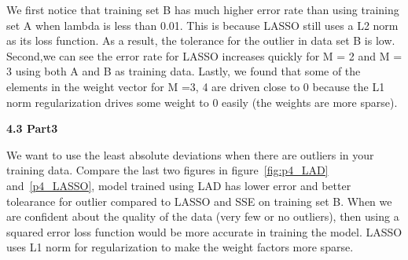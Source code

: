 We first notice that training set B has much higher error rate than using training set A when lambda is less than 0.01. This is because LASSO still uses a L2 norm as its loss function. As a result, the tolerance for the outlier in data set B is low. Second,we can see the error rate for LASSO increases quickly for M = 2 and M = 3 using both A and B as training data. Lastly, we found that some of the elements in the weight vector for M =3, 4 are driven close to 0 because the L1 norm regularization drives some weight to 0 easily (the weights are more sparse).  

{\bfseries 4.3 Part3}

We want to use the least absolute deviations when there are outliers in your training data. Compare the last two figures in figure~\ref{fig:p4_LAD} and~\ref{p4_LASSO}, model trained using LAD has lower error and better tolearance for outlier compared to LASSO and SSE on training set B. When we are confident about the quality of the data (very few or no outliers), then using a squared error loss function would be more accurate in training the model. LASSO uses L1 norm for regularization to make the weight factors more sparse. 

